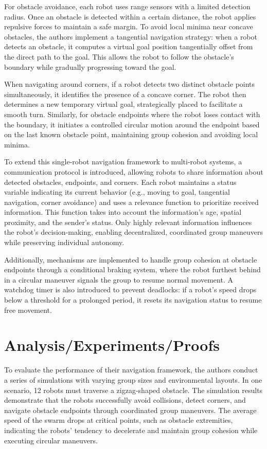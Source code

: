 \documentclass[conference]{IEEEtran}
\begin{document}
For obstacle avoidance, each robot uses range sensors with a limited detection radius. Once an obstacle is detected within a certain 
distance, the robot applies repulsive forces to maintain a safe margin. To avoid local minima near concave obstacles, the authors 
implement a tangential navigation strategy: when a robot detects an obstacle, it computes a virtual goal position tangentially offset 
from the direct path to the goal. This allows the robot to follow the obstacle's boundary while gradually progressing toward the goal.

When navigating around corners, if a robot detects two distinct obstacle points simultaneously, it identifies the presence of a concave 
corner. The robot then determines a new temporary virtual goal, strategically placed to facilitate a smooth turn. Similarly, for obstacle 
endpoints where the robot loses contact with the boundary, it initiates a controlled circular motion around the endpoint based on the 
last known obstacle point, maintaining group cohesion and avoiding local minima.

To extend this single-robot navigation framework to multi-robot systems, a communication protocol is introduced, allowing robots to 
share information about detected obstacles, endpoints, and corners. Each robot maintains a status variable indicating its current 
behavior (e.g., moving to goal, tangential navigation, corner avoidance) and uses a relevance function to prioritize received 
information. This function takes into account the information's age, spatial proximity, and the sender's status. Only highly relevant 
information influences the robot's decision-making, enabling decentralized, coordinated group maneuvers while preserving individual autonomy.

Additionally, mechanisms are implemented to handle group cohesion at obstacle endpoints through a conditional braking system, where 
the robot furthest behind in a circular maneuver signals the group to resume normal movement. A watchdog timer is also introduced to 
prevent deadlocks: if a robot's speed drops below a threshold for a prolonged period, it resets its navigation status to resume free movement.


\section{Analysis/Experiments/Proofs}
\cite{Olcay.2020} To evaluate the performance of their navigation framework, the authors conduct a series of simulations with varying 
group sizes and environmental layouts. In one scenario, 12 robots must traverse a zigzag-shaped obstacle. The simulation results 
demonstrate that the robots successfully avoid collisions, detect corners, and navigate obstacle endpoints through coordinated group 
maneuvers. The average speed of the swarm drops at critical points, such as obstacle extremities, indicating the robots' tendency to 
decelerate and maintain group cohesion while executing circular maneuvers.
\end{document}
